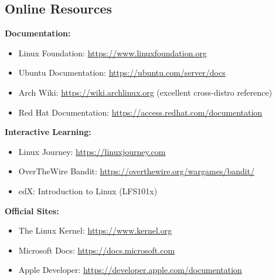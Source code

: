 \subsection{Online Resources}

\textbf{Documentation:}
\begin{itemize}
    \item Linux Foundation: \url{https://www.linuxfoundation.org}
    \item Ubuntu Documentation: \url{https://ubuntu.com/server/docs}
    \item Arch Wiki: \url{https://wiki.archlinux.org} (excellent cross-distro reference)
    \item Red Hat Documentation: \url{https://access.redhat.com/documentation}
\end{itemize}

\textbf{Interactive Learning:}
\begin{itemize}
    \item Linux Journey: \url{https://linuxjourney.com}
    \item OverTheWire Bandit: \url{https://overthewire.org/wargames/bandit/}
    \item edX: Introduction to Linux (LFS101x)
\end{itemize}

\textbf{Official Sites:}
\begin{itemize}
    \item The Linux Kernel: \url{https://www.kernel.org}
    \item Microsoft Docs: \url{https://docs.microsoft.com}
    \item Apple Developer: \url{https://developer.apple.com/documentation}
\end{itemize}
